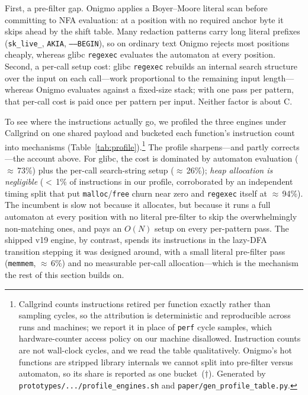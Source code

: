 \documentclass[acmsmall,nonacm,screen]{acmart}
\begin{document}
First, a pre-filter gap. Onigmo applies a Boyer--Moore literal scan before
committing to NFA evaluation: at a position with no required anchor byte it skips
ahead by the shift table. Many redaction patterns carry long literal prefixes
(\texttt{sk\_live\_}, \texttt{AKIA}, \texttt{-----BEGIN}), so on ordinary text
Onigmo rejects most positions cheaply, whereas glibc \texttt{regexec} evaluates
the automaton at every position. Second, a per-call setup cost: glibc
\texttt{regexec} rebuilds an internal search structure over the input on each
call---work proportional to the remaining input length---whereas Onigmo evaluates
against a fixed-size stack; with one pass per pattern, that per-call cost is paid
once per pattern per input. Neither factor is about C.

To see where the instructions actually go, we profiled the three engines under
Callgrind on one shared payload and bucketed each function's instruction count
into mechanisms (Table~\ref{tab:profile}).\footnote{Callgrind counts instructions
retired per function exactly rather than sampling cycles, so the attribution is
deterministic and reproducible across runs and machines; we report it in place of
\texttt{perf} cycle samples, which hardware-counter access policy on our machine
disallowed. Instruction counts are not wall-clock cycles, and we read the table
qualitatively. Onigmo's hot functions are stripped library internals we cannot
split into pre-filter versus automaton, so its share is reported as one
bucket~($\dagger$). Generated by \texttt{prototypes/.../profile\_engines.sh} and
\texttt{paper/gen\_profile\_table.py}.} The profile sharpens---and partly
corrects---the account above. For glibc, the cost is dominated by automaton
evaluation ($\approx$\,73\%) plus the per-call search-string setup
($\approx$\,26\%); \emph{heap allocation is negligible} ($<$\,1\% of instructions
in our profile, corroborated by an independent timing split that put
\texttt{malloc}/\texttt{free} churn near zero and \texttt{regexec} itself at
$\approx$\,94\%). The incumbent is slow not because it allocates, but because it
runs a full automaton at every position with no literal pre-filter to skip the
overwhelmingly non-matching ones, and pays an $O(N)$ setup on every per-pattern
pass. The shipped v19 engine, by contrast, spends its instructions in the
lazy-DFA transition stepping it was designed around, with a small literal
pre-filter pass (\texttt{memmem}, $\approx$\,6\%) and no measurable per-call
allocation---which is the mechanism the rest of this section builds on.
\end{document}

